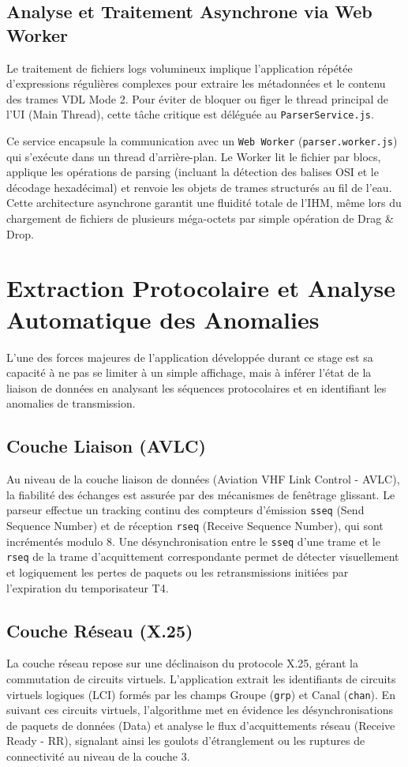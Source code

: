 \documentclass[a4paper,11pt]{report}
\begin{document}
\section{Analyse et Traitement Asynchrone via Web Worker}
Le traitement de fichiers logs volumineux implique l'application répétée d'expressions régulières complexes pour extraire les métadonnées et le contenu des trames VDL Mode 2. Pour éviter de bloquer ou figer le thread principal de l'UI (Main Thread), cette tâche critique est déléguée au \texttt{ParserService.js}.

Ce service encapsule la communication avec un \texttt{Web Worker} (\texttt{parser.worker.js}) qui s'exécute dans un thread d'arrière-plan. Le Worker lit le fichier par blocs, applique les opérations de parsing (incluant la détection des balises OSI et le décodage hexadécimal) et renvoie les objets de trames structurés au fil de l'eau. Cette architecture asynchrone garantit une fluidité totale de l'IHM, même lors du chargement de fichiers de plusieurs méga-octets par simple opération de Drag \& Drop.

\chapter{Extraction Protocolaire et Analyse Automatique des Anomalies}

L'une des forces majeures de l'application développée durant ce stage est sa capacité à ne pas se limiter à un simple affichage, mais à inférer l'état de la liaison de données en analysant les séquences protocolaires et en identifiant les anomalies de transmission.

\section{Couche Liaison (AVLC)}
Au niveau de la couche liaison de données (Aviation VHF Link Control - AVLC), la fiabilité des échanges est assurée par des mécanismes de fenêtrage glissant. Le parseur effectue un tracking continu des compteurs d'émission \texttt{sseq} (Send Sequence Number) et de réception \texttt{rseq} (Receive Sequence Number), qui sont incrémentés modulo 8.
Une désynchronisation entre le \texttt{sseq} d'une trame et le \texttt{rseq} de la trame d'acquittement correspondante permet de détecter visuellement et logiquement les pertes de paquets ou les retransmissions initiées par l'expiration du temporisateur T4.

\section{Couche Réseau (X.25)}
La couche réseau repose sur une déclinaison du protocole X.25, gérant la commutation de circuits virtuels. L'application extrait les identifiants de circuits virtuels logiques (LCI) formés par les champs Groupe (\texttt{grp}) et Canal (\texttt{chan}). 
En suivant ces circuits virtuels, l'algorithme met en évidence les désynchronisations de paquets de données (Data) et analyse le flux d'acquittements réseau (Receive Ready - RR), signalant ainsi les goulots d'étranglement ou les ruptures de connectivité au niveau de la couche 3.
\end{document}
